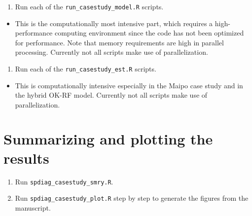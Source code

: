 \documentclass[
]{article}
\providecommand{\tightlist}{%
  \setlength{\itemsep}{0pt}\setlength{\parskip}{0pt}}
\begin{document}
\begin{enumerate}
\def\labelenumi{\arabic{enumi}.}
\setcounter{enumi}{2}
\tightlist
\item
  Run each of the \texttt{run\_casestudy\_model.R} scripts.
\end{enumerate}

\begin{itemize}
\tightlist
\item
  This is the computationally most intensive part, which requires a high-performance computing environment since the code has not been optimized for performance. Note that memory requirements are high in parallel processing. Currently not all scripts make use of parallelization.
\end{itemize}

\begin{enumerate}
\def\labelenumi{\arabic{enumi}.}
\setcounter{enumi}{3}
\tightlist
\item
  Run each of the \texttt{run\_casestudy\_est.R} scripts.
\end{enumerate}

\begin{itemize}
\tightlist
\item
  This is computationally intensive especially in the Maipo case study and in the hybrid OK-RF model. Currently not all scripts make use of parallelization.
\end{itemize}

\hypertarget{summarizing-and-plotting-the-results}{%
\section{Summarizing and plotting the results}\label{summarizing-and-plotting-the-results}}

\begin{enumerate}
\def\labelenumi{\arabic{enumi}.}
\setcounter{enumi}{4}
\tightlist
\item
  Run \texttt{spdiag\_casestudy\_smry.R}.
\item
  Run \texttt{spdiag\_casestudy\_plot.R} step by step to generate the figures from the manuscript.
\end{enumerate}
\end{document}
